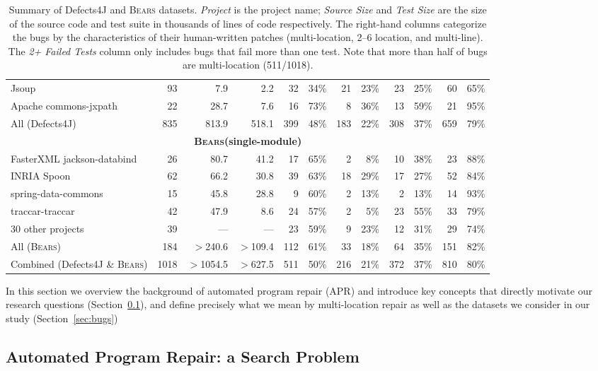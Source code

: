 \documentclass[10pt, conference]{IEEEtran}
\newcommand\bears{\textsc{Bears}\xspace}
\begin{document}
\begin{table}
\begin{center}
\begin{tabular}{l  rrr | rr rr rr rr }
Jsoup & 93 & 7.9 & 2.2 & 32 & 34\% & 21 & 23\% & 23 & 25\% & 60 & 65\% \\
Apache commons-jxpath & 22 & 28.7 & 7.6 & 16 & 73\% & 8 & 36\% & 13 & 59\% & 21 & 95\% \\
\midrule
All (Defects4J) & 835 & 813.9 & 518.1 & 399 & 48\% & 183 & 22\% & 308 & 37\% & 659 & 79\%\\
\midrule
\multicolumn{12}{c}{\textbf{\bears (single-module)}} \\
\midrule
FasterXML jackson-databind & 26 & 80.7 & 41.2 & 17 & 65\% & 2 & 8\% & 10 & 38\% & 23 & 88\% \\
INRIA Spoon & 62 & 66.2 & 30.8  & 39 & 63\% & 18 & 29\% & 17 & 27\% & 52 & 84\% \\
spring-data-commons & 15 & 45.8 & 28.8  & 9 & 60\% & 2 & 13\% & 2 & 13\% & 14 & 93\% \\
traccar-traccar & 42 & 47.9 & 8.6 & 24 & 57\% & 2 & 5\% & 23 & 55\% & 33 & 79\% \\
30 other projects & 39 & --- & --- & 23 & 59\% & 9 & 23\% & 12 & 31\% & 29 & 74\% \\
\midrule
All (\bears) & 184 & $>$240.6 & $>$109.4 & 112 & 61\% & 33 & 18\% & 64 & 35\% & 151 & 82\% \\
\midrule
Combined (Defects4J \& \bears) & 1018 & $>$1054.5 & $>$627.5 & 511 & 50\% & 216 & 21\% & 372 & 37\% & 810 & 80\%\\
\bottomrule
\end{tabular}
\end{center}
\caption{\label{tab:dataset-characteristics} \small Summary of Defects4J and \bears
  datasets. \emph{Project} is the project name; \emph{Source Size} and
  \emph{Test Size} are the size of the source code and test suite in thousands
  of lines of code respectively. The right-hand columns categorize the bugs by
  the characteristics of their human-written patches (multi-location, 2--6
  location, and multi-line). The \emph{2+ Failed Tests} column only includes
  bugs that fail more than one test. Note that more than half of bugs are
  multi-location (511/1018).  }
\end{table}

In this section we overview the background of automated program repair (APR) and
introduce key concepts that directly motivate our research questions
(Section~\ref{sec:apr}), and define precisely what we mean by multi-location
repair as well as the datasets we consider in our study (Section~\ref{sec:bugs})

\subsection{Automated Program Repair: a Search Problem}
\label{sec:apr}
\end{document}
